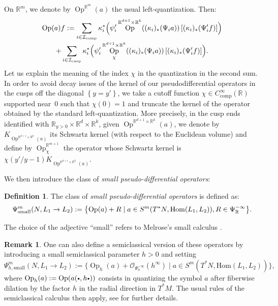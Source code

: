 \documentclass[JEP,XML,SOM,Unicode,NoFloatCountersInSection]{cedram}
\let\ra\rightarrow
\newcommand{\sbullet}{{\scriptscriptstyle\bullet}}
\newcommand{\csbullet}{{\raisebox{1pt}{$\sbullet$}}}
\newcommand{\R}{\mathbb{R}}
\newcommand{\mc}{\mathcal}
\DeclareMathOperator{\Op}{Op}
\theoremstyle{plain}
\theoremstyle{definition}
\newtheorem{definition}{Definition}[section]
\newtheorem{remark}{Remark}[section]
\begin{document}
On $\R^{m}$, we denote by $\Op^{\R^{m}}(a)$ the usual left-quantization. Then:
\begin{multline}
\label{equation:quantization}
\Op(a)f := \sum_{i \in \mc{I}_{\mathrm{comp}}} \kappa_i^*\Bigl( \psi'_i \Op^{\R^{d+1} \times \R^k}( (\kappa_i)_*(\Psi_i a))\left[(\kappa_i)_*(\Psi'_i f) \right] \Bigr) \\[-3pt]
+ \sum_{i \in \mc{I}_{\mathrm{cusp}}} \kappa_i^*\Bigl( \psi'_i \Op^{\R^{d+1} \times \R^k}_{\chi}( (\kappa_i)_*(\Psi_i a))\left[(\kappa_i)_*(\Psi'_i f) \right] \Bigr).
\end{multline}
Let us explain the meaning of the index $\chi$ in the quantization in the second sum. In order to avoid decay issues of the kernel of our pseudodifferential operators in the cusps off the diagonal $\left\{y = y'\right\}$, we take a cutoff function $\chi \in C^\infty_{\mathrm{comp}}(\R)$ supported near~$0$ such that $\chi(0)=1$ and truncate the kernel of the operator obtained by the standard left-quantization. More precisely, in the cusp ends identified with $\R_{y > 0} \times \R^d \times \R^k$, given $\Op^{\R^{d+1} \times \R^k}(a)$, we denote by $K_{\Op^{\R^{d+1} \times \R^k}(a)}$ its Schwartz kernel (with respect to the Euclidean volume) and define by $\Op^{\R^{m+1}}_\chi$ the operator whose Schwartz kernel is $\chi(y'/y-1)K_{\Op^{\R^{d+1} \times \R^k}(a)}$.

We then introduce the class of \emph{small pseudo-differential operators}:

\begin{definition}
\label{definition:small}
The class of \emph{small pseudo-differential operators} is defined as:
\[
\Psi^m_{\textup{small}}(N, L_1\ra L_2) := \bigl\{ \Op(a) + R \mid a\in S^m(T^\ast N, \mathrm{Hom}(L_1,L_2)), R\in \Psi^{-\infty}_{\R} \bigr\}.
\]
\end{definition}

The choice of the adjective ``small'' refers to Melrose's small calculus \cite{Melrose-APS-93}.

\begin{remark}
\label{remark:semiclassical} One can also define a semiclassical version of these operators by introducing a small semiclassical parameter $h > 0$ and setting
\[
\Psi^m_{h,\text{small}}(N, L_1\ra L_2) := \bigl\{ \Op_h(a) + \mc{O}_{\Psi^{-\infty}_h}(h^\infty) \mid a\in S^m(T^\ast N, \mathrm{Hom}(L_1,L_2)) \bigr\},
\]
where $\Op_h(a) := \Op(a(\csbullet, h \csbullet))$ consists in quantizing the symbol $a$ after fiberwise dilation by the factor $h$ in the radial direction in $T^*M$. The usual rules of the semiclassical calculus then apply, see \cite{Bonthonneau-16} for further details.
\end{remark}
\end{document}
